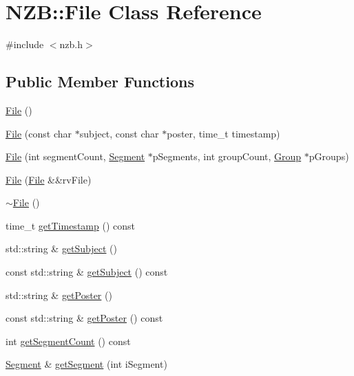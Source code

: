 \hypertarget{class_n_z_b_1_1_file}{}\section{N\+ZB\+:\+:File Class Reference}
\label{class_n_z_b_1_1_file}


{\ttfamily \#include $<$nzb.\+h$>$}

\subsection*{Public Member Functions}
\begin{DoxyCompactItemize}
\item 
\hyperlink{class_n_z_b_1_1_file_ac5e08598cb3f05601149485eb02eae7a}{File} ()
\item 
\hyperlink{class_n_z_b_1_1_file_a1d87fa686b8f2cb0c2b8820ef088ba05}{File} (const char $\ast$subject, const char $\ast$poster, time\+\_\+t timestamp)
\item 
\hyperlink{class_n_z_b_1_1_file_af83c62781c50d7cc8e1808234920b8a6}{File} (int segment\+Count, \hyperlink{class_n_z_b_1_1_segment}{Segment} $\ast$p\+Segments, int group\+Count, \hyperlink{class_n_z_b_1_1_group}{Group} $\ast$p\+Groups)
\item 
\hyperlink{class_n_z_b_1_1_file_a3863e5112bd3e0ee5be4770bc7b4cb5e}{File} (\hyperlink{class_n_z_b_1_1_file}{File} \&\&rv\+File)
\item 
\hyperlink{class_n_z_b_1_1_file_ab9c267164945ff326166490b427b7393}{$\sim$\+File} ()
\item 
time\+\_\+t \hyperlink{class_n_z_b_1_1_file_a01adb6cd77a2f9546043aec2d8fef936}{get\+Timestamp} () const
\item 
std\+::string \& \hyperlink{class_n_z_b_1_1_file_a1110d411e6e7fd3ecb9b7f74e476924b}{get\+Subject} ()
\item 
const std\+::string \& \hyperlink{class_n_z_b_1_1_file_aa14b0404ce708a3cd15c7aa6803704ee}{get\+Subject} () const
\item 
std\+::string \& \hyperlink{class_n_z_b_1_1_file_a5203542d4807f92d520c6101a8927af9}{get\+Poster} ()
\item 
const std\+::string \& \hyperlink{class_n_z_b_1_1_file_af093b1edbffcafdae7f37c05d6581d0e}{get\+Poster} () const
\item 
int \hyperlink{class_n_z_b_1_1_file_a2aab94f806e5cc265413e3ad4d7e5ec2}{get\+Segment\+Count} () const
\item 
\hyperlink{class_n_z_b_1_1_segment}{Segment} \& \hyperlink{class_n_z_b_1_1_file_a5f4d723636e54b354f89c34cd3e578cb}{get\+Segment} (int i\+Segment)

\end{DoxyCompactItemize}
